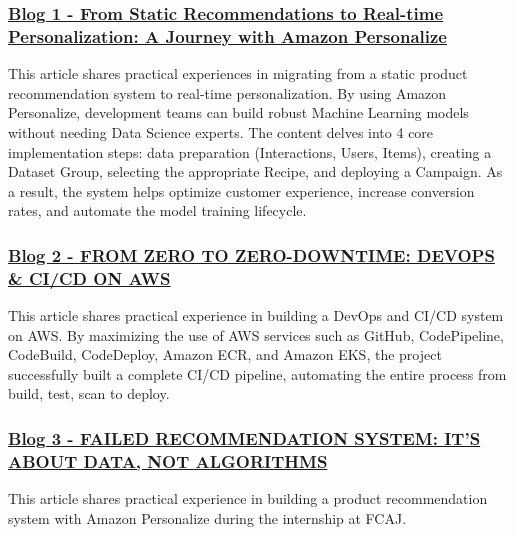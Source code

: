 \subsubsection{\texorpdfstring{\href{3.1-Blog1/}{Blog 1 - From Static
Recommendations to Real-time Personalization: A Journey with Amazon
Personalize}}{Blog 1 - From Static Recommendations to Real-time Personalization: A Journey with Amazon Personalize}}

This article shares practical experiences in migrating from a static
product recommendation system to real-time personalization. By using
Amazon Personalize, development teams can build robust Machine Learning
models without needing Data Science experts. The content delves into 4
core implementation steps: data preparation (Interactions, Users,
Items), creating a Dataset Group, selecting the appropriate Recipe, and
deploying a Campaign. As a result, the system helps optimize customer
experience, increase conversion rates, and automate the model training
lifecycle.

\subsubsection{\texorpdfstring{\href{3.2-Blog2/}{Blog 2 - FROM ZERO TO
ZERO-DOWNTIME: DEVOPS \& CI/CD ON
AWS}}{Blog 2 - FROM ZERO TO ZERO-DOWNTIME: DEVOPS \& CI/CD ON AWS}}

This article shares practical experience in building a DevOps and CI/CD
system on AWS. By maximizing the use of AWS services such as GitHub,
CodePipeline, CodeBuild, CodeDeploy, Amazon ECR, and Amazon EKS, the
project successfully built a complete CI/CD pipeline, automating the
entire process from build, test, scan to deploy.

\subsubsection{\texorpdfstring{\href{3.3-Blog3/}{Blog 3 - FAILED
RECOMMENDATION SYSTEM: IT'S ABOUT DATA, NOT
ALGORITHMS}}{Blog 3 - FAILED RECOMMENDATION SYSTEM: IT'S ABOUT DATA, NOT ALGORITHMS}}

This article shares practical experience in building a product
recommendation system with Amazon Personalize during the internship at
FCAJ.
